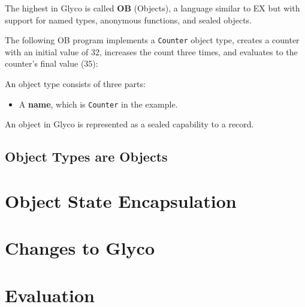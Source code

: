 \documentclass[main.tex]{subfiles}
\begin{document}
The highest  in Glyco is called \textbf{OB} (Objects), a language similar to EX but with support for named types, anonymous functions, and sealed objects.

The following OB program implements a \texttt{Counter} object type, creates a counter with an initial value of 32, increases the count three times, and evaluates to the counter's final value (35):


An object type consists of three parts:
\begin{itemize}
    \item A \textbf{name}, which is \texttt{Counter} in the example.
\end{itemize}

An object in Glyco is represented as a sealed capability to a record.

\subsection{Object Types are Objects}

\section{Object State Encapsulation} \label{sct:obj-sec}

\section{Changes to Glyco} \label{sct:obj-changes}

\section{Evaluation} \label{sct:obj-eval}

\onlyinsubfile{\glsaddall\printglossaries}
\end{document}

